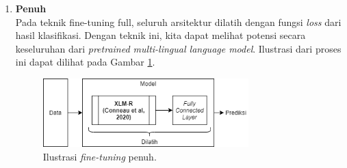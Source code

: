 \begin{enumerate}
		\item \textbf{Penuh}\\
		Pada teknik fine-tuning full, seluruh arsitektur dilatih dengan fungsi \textit{loss} dari hasil klasifikasi. Dengan teknik ini, kita dapat melihat potensi secara keseluruhan dari \textit{pretrained multi-lingual language model}. Ilustrasi dari proses ini dapat dilihat pada Gambar \ref{fig:ilustrasi_full_fine_tune}.

		\begin{figure}[h]
		    \centering
		    \includegraphics[width=0.75\textwidth]{resources/Full-fine-tune.png}
		    \caption{ Ilustrasi \textit{fine-tuning} penuh.}
		    \label{fig:ilustrasi_full_fine_tune}
		\end{figure}

		
	\end{enumerate}

